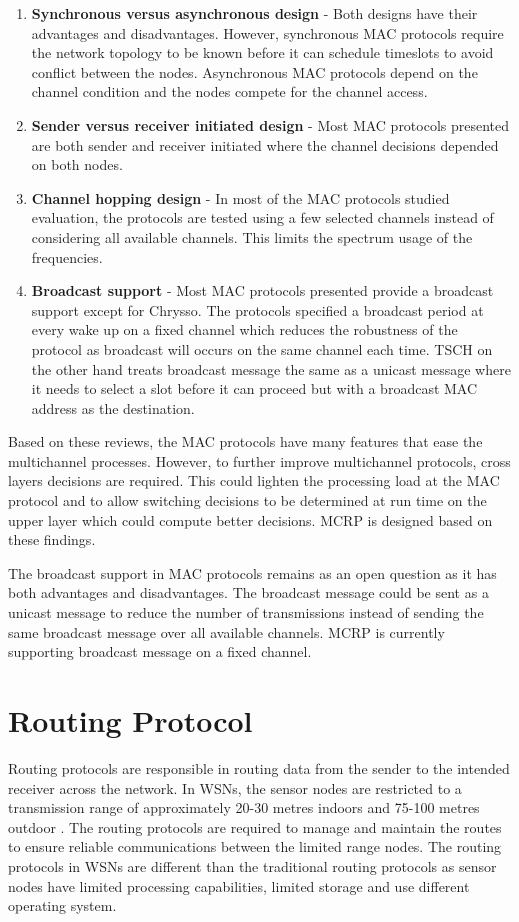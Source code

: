 \begin{enumerate}
\item \textbf{Synchronous versus asynchronous design} - 
Both designs have their advantages and disadvantages. However, synchronous MAC protocols require the network topology to be known before it can schedule timeslots to avoid conflict between the nodes. Asynchronous MAC protocols depend on the channel condition and the nodes compete for the channel access.

\item \textbf{Sender versus receiver initiated design} - 
Most MAC protocols presented are both sender and receiver initiated where the channel decisions depended on both nodes.

\item \textbf{Channel hopping design} - 
In most of the MAC protocols studied evaluation, the protocols are tested using a few selected channels instead of considering all available channels. This limits the spectrum usage of the frequencies.

\item \textbf{Broadcast support} - 
Most MAC protocols presented provide a broadcast support except for Chrysso. The protocols specified a broadcast period at every wake up on a fixed channel which reduces the robustness of the protocol as broadcast will occurs on the same channel each time. TSCH on the other hand treats broadcast message the same as a unicast message where it needs to select a slot before it can proceed but with a broadcast MAC address as the destination.
\end{enumerate}

Based on these reviews, the MAC protocols have many features that ease the multichannel processes. However, to further improve multichannel protocols, cross layers decisions are required. This could lighten the processing load at the MAC protocol and to allow switching decisions to be determined at run time on the upper layer which could compute better decisions. MCRP is designed based on these findings. 

The broadcast support in MAC protocols remains as an open question as it has both advantages and disadvantages. The broadcast message could be sent as a unicast message to reduce the number of transmissions instead of sending the same broadcast message over all available channels. MCRP is currently supporting broadcast message on a fixed channel. 

\section{Routing Protocol}
\label{routingProtocols}
Routing protocols are responsible in routing data from the sender to the intended receiver across the network. In WSNs, the sensor nodes are restricted to a transmission range of approximately 20-30 metres indoors and 75-100 metres outdoor \cite{telosb-datasheet}. The routing protocols are required to manage and maintain the routes to ensure reliable communications between the limited range nodes. The routing protocols in WSNs are different than the traditional routing protocols as sensor nodes have limited processing capabilities, limited storage and use different operating system.

